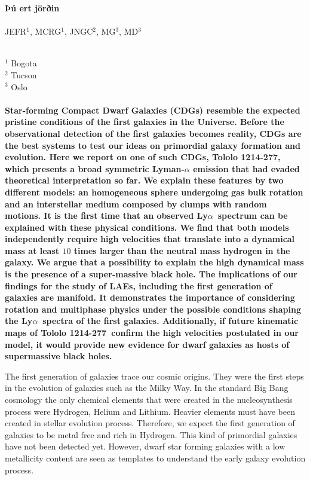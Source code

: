 \documentclass[a4paper, usenatbib, 12pt]{article}
\newcommand{\tol}{Tololo 1214-277}
\newcommand{\lya}{Ly$\alpha$}
\begin{document}
\pagestyle{empty}
\noindent
\textbf{Þú ert jörðin}
\\
\\
JEFR$^{1}$, MCRG$^1$, JNGC$^2$, MG$^3$, MD$^3$
\\
\\
\scriptsize
{$^1$ Bogota
\\
$^2$ Tucson
\\
$^3$ Oslo
\normalsize
\\
\\
\textbf{
  Star-forming Compact Dwarf Galaxies (CDGs) resemble the expected
  pristine conditions of the first galaxies in the Universe.    
Before the observational detection of the first galaxies becomes
reality, CDGs are the best systems to test our ideas on primordial
galaxy formation and evolution.    
Here we report on one of such CDGs, \tol, which presents
a broad symmetric Lyman-$\alpha$ emission that had evaded theoretical
interpretation so far. 
We explain these features by two different models: an
homogeneous sphere undergoing gas bulk rotation and an interstellar
medium composed by clumps with random motions.
It is the first time that an observed \lya\ spectrum can be explained
with these physical conditions.
We  find that both models independently require high velocities that
translate into a dynamical mass at least $10$ times larger than the
neutral mass hydrogen in the galaxy. 
We argue that a possibility to explain the high
dynamical mass is the presence of a super-massive black hole.
The implications of our findings for the study of LAEs, including the
first generation of galaxies are manifold. 
It demonstrates the importance of considering rotation and multiphase
physics under the possible conditions shaping the \lya\ spectra of the
first galaxies. 
Additionally, if future kinematic maps of \tol\ confirm the high
velocities postulated in our model, it would provide new
evidence for dwarf galaxies as hosts of supermassive black holes. 
}  



The first generation of galaxies trace our cosmic origins. 
They were the first steps in the evolution of galaxies such as the Milky
Way. 
In the standard Big Bang cosmology the only chemical elements that
were created in the nucleosynthesis process were Hydrogen, Helium and
Lithium.  
Heavier elements must have been created in stellar evolution process. 
Therefore, we expect the first generation of
galaxies to be metal free and rich in Hydrogen. 
This kind of primordial galaxies have not been detected yet. 
However, dwarf star forming galaxies with a low metallicity content
are seen as templates to understand the early galaxy evolution process. 

}
\end{document}
